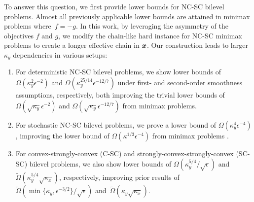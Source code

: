 \documentclass{article}
\begin{document}
To answer this question, we first provide lower bounds for NC-SC bilevel problems. Almost all previously applicable lower bounds are attained in minimax problems where~$f = -g$. In this work, by leveraging the asymmetry of the objectives $f$ and $g$, we modify the chain-like hard instance for NC-SC minimax problems \citep{li2021complexity} to create a longer effective chain in ${\bm{x}}$.
Our construction leads to larger $\kappa_y$ dependencies in various setups:
\vspace{-1mm}
\begin{enumerate}
    \item For deterministic NC-SC bilevel problems, we show lower bounds of 
$\Omega(\kappa_y^2 \epsilon^{-2})$ and  $\Omega(\kappa_y^{25/14}\epsilon^{-12/7})$ under first- and second-order smoothness assumptions, respectively, both improving the trivial lower bounds 
of $\Omega(\sqrt{\kappa_y} \epsilon^{-2})$ \citep{li2021complexity} and 
 $\Omega(\sqrt{\kappa_y} \epsilon^{-12/7})$ 
\citep{wang2024efficient} from minimax problems.
\vspace{-1mm}
\item For stochastic NC-SC bilevel problems, we prove a lower bound of 
$\Omega(\kappa_y^4 \epsilon^{-4})$, improving the lower bound of $\Omega(\kappa^{1/3} \epsilon^{-4})$ 
from minimax problems \citep{li2021complexity}.
\vspace{-1mm}
\item For convex-strongly-convex (C-SC) and strongly-convex-strongly-convex (SC-SC) bilevel problems, we also show lower bounds of 
$\Omega(\kappa_y^{5/4} / \sqrt{\epsilon})$ and $\tilde \Omega(\kappa_y^{5/4} \sqrt{\kappa_x})$, respectively, improving 
prior results \citep{ji2023lower}
of $\tilde \Omega(\min \{ \kappa_y, \epsilon^{-3/2} \} / \sqrt{\epsilon} )$ and~$\tilde \Omega(\kappa_y \sqrt{\kappa_x})$.
\end{enumerate}
\end{document}
